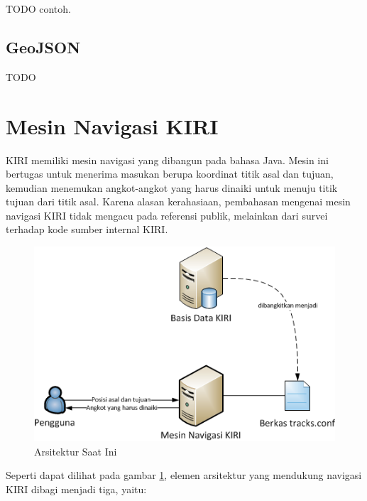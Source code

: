 TODO contoh.

\subsection{GeoJSON}

TODO

\section{Mesin Navigasi KIRI}
\label{sec:mesin_navigasi_kiri}

KIRI memiliki mesin navigasi yang dibangun pada bahasa Java. Mesin ini bertugas untuk menerima masukan berupa koordinat titik asal dan tujuan, kemudian menemukan angkot-angkot yang harus dinaiki untuk menuju titik tujuan dari titik asal. Karena alasan kerahasiaan, pembahasan mengenai mesin navigasi KIRI tidak mengacu pada referensi publik, melainkan dari survei terhadap kode sumber internal KIRI.

\begin{figure}
	\centering
	\includegraphics[scale=1]{Gambar/2_arsitektur_saat_ini}
	\caption{Arsitektur Saat Ini} 
	\label{fig:2_arsitektur_saat_ini}
\end{figure}

Seperti dapat dilihat pada gambar \ref{fig:2_arsitektur_saat_ini}, elemen
arsitektur yang mendukung navigasi KIRI dibagi menjadi tiga, yaitu:

